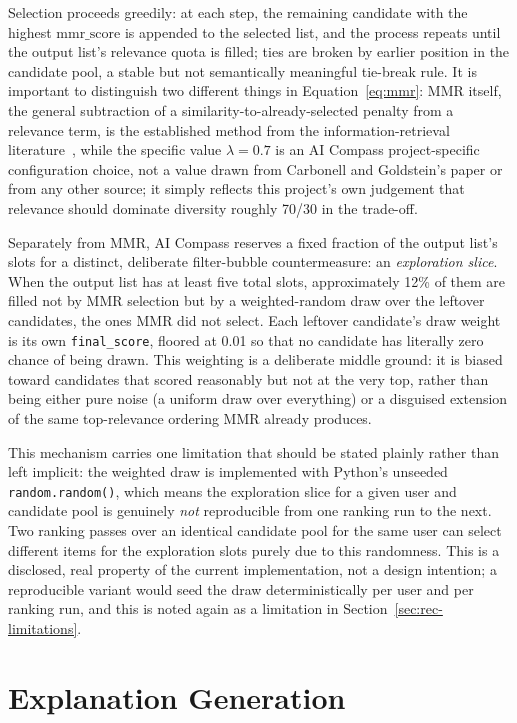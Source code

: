 Selection proceeds greedily: at each step, the remaining candidate with the highest $\text{mmr\_score}$ is appended to the selected list, and the process repeats until the output list's relevance quota is filled; ties are broken by earlier position in the candidate pool, a stable but not semantically meaningful tie-break rule. It is important to distinguish two different things in Equation~\ref{eq:mmr}: MMR itself, the general subtraction of a similarity-to-already-selected penalty from a relevance term, is the established method from the information-retrieval literature~\cite{carbonell1998mmr}, while the specific value $\lambda = 0.7$ is an AI Compass project-specific configuration choice, not a value drawn from Carbonell and Goldstein's paper or from any other source; it simply reflects this project's own judgement that relevance should dominate diversity roughly 70/30 in the trade-off.

Separately from MMR, AI Compass reserves a fixed fraction of the output list's slots for a distinct, deliberate filter-bubble countermeasure: an \emph{exploration slice}. When the output list has at least five total slots, approximately 12\% of them are filled not by MMR selection but by a weighted-random draw over the leftover candidates, the ones MMR did not select. Each leftover candidate's draw weight is its own \texttt{final\_score}, floored at 0.01 so that no candidate has literally zero chance of being drawn. This weighting is a deliberate middle ground: it is biased toward candidates that scored reasonably but not at the very top, rather than being either pure noise (a uniform draw over everything) or a disguised extension of the same top-relevance ordering MMR already produces.

This mechanism carries one limitation that should be stated plainly rather than left implicit: the weighted draw is implemented with Python's unseeded \texttt{random.random()}, which means the exploration slice for a given user and candidate pool is genuinely \emph{not} reproducible from one ranking run to the next. Two ranking passes over an identical candidate pool for the same user can select different items for the exploration slots purely due to this randomness. This is a disclosed, real property of the current implementation, not a design intention; a reproducible variant would seed the draw deterministically per user and per ranking run, and this is noted again as a limitation in Section~\ref{sec:rec-limitations}.

\section{Explanation Generation}
\label{sec:rec-explanations}

